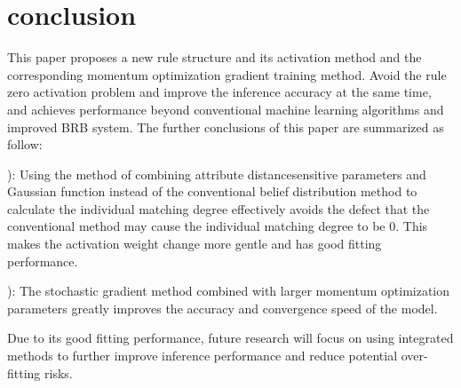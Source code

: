 \documentclass{ieeeaccess}
\begin{document}
\section{conclusion}
This paper proposes a new rule structure and its activation method and the corresponding momentum optimization gradient training method.
Avoid the rule zero activation problem and improve the inference accuracy at the same time,
and achieves performance beyond conventional machine learning algorithms and improved BRB system.
The further conclusions of this paper are summarized as follow:

): Using the method of combining attribute distancesensitive parameters and Gaussian function instead of
the conventional belief distribution method to calculate the individual matching degree effectively avoids the defect that
the conventional method may cause the individual matching degree to be 0.
This makes the activation weight change more gentle and has good fitting performance.

): The stochastic gradient method combined with larger momentum optimization parameters greatly improves the accuracy and convergence speed of the model.

Due to its good fitting performance, future research will focus on using integrated methods to further improve inference performance and reduce potential over-fitting risks.
\end{document}
